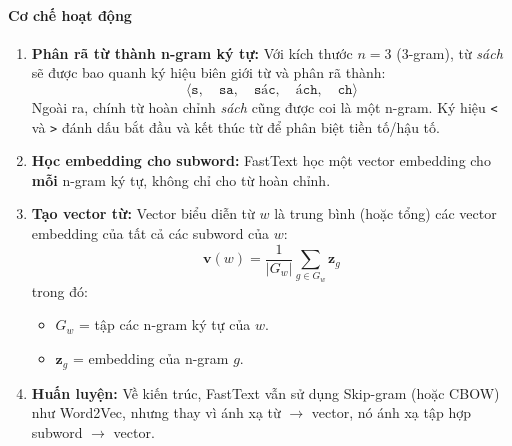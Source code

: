 \paragraph{Cơ chế hoạt động}
\begin{enumerate}
    \item \textbf{Phân rã từ thành n-gram ký tự:}  
    Với kích thước $n=3$ (3-gram), từ \textit{sách} sẽ được bao quanh ký hiệu biên giới từ và phân rã thành:
    \[
    \langle \texttt{s}, \quad \texttt{sa}, \quad \texttt{sác}, \quad \texttt{ách}, \quad \texttt{ch}\rangle
    \]
    Ngoài ra, chính từ hoàn chỉnh \textit{sách} cũng được coi là một n-gram.  
    Ký hiệu \verb|<| và \verb|>| đánh dấu bắt đầu và kết thúc từ để phân biệt tiền tố/hậu tố.

    \item \textbf{Học embedding cho subword:}  
    FastText học một vector embedding cho \textbf{mỗi} n-gram ký tự, không chỉ cho từ hoàn chỉnh.

    \item \textbf{Tạo vector từ:}  
    Vector biểu diễn từ $w$ là trung bình (hoặc tổng) các vector embedding của tất cả các subword của $w$:
    \[
    \mathbf{v}(w) = \frac{1}{|G_w|} \sum_{g \in G_w} \mathbf{z}_g
    \]
    trong đó:
    \begin{itemize}
        \item $G_w$ = tập các n-gram ký tự của $w$.
        \item $\mathbf{z}_g$ = embedding của n-gram $g$.
    \end{itemize}

    \item \textbf{Huấn luyện:}  
    Về kiến trúc, FastText vẫn sử dụng Skip-gram (hoặc CBOW) như Word2Vec, nhưng thay vì ánh xạ từ $\rightarrow$ vector, nó ánh xạ tập hợp subword $\rightarrow$ vector.
\end{enumerate}

